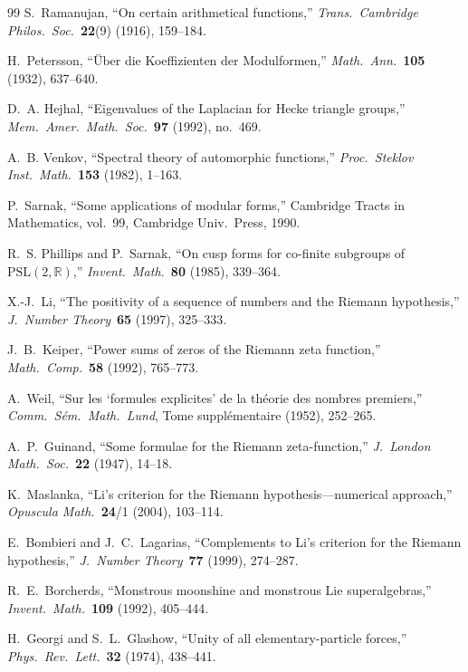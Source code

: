 \documentclass[11pt,a4paper]{article}
\theoremstyle{plain}
\theoremstyle{remark}
\newcommand{\R}{\mathbb{R}}
\begin{document}
\begin{thebibliography}{99}
S.~Ramanujan,
``On certain arithmetical functions,''
\emph{Trans.\ Cambridge Philos.\ Soc.}\ \textbf{22}(9) (1916), 159--184.

H.~Petersson,
``\"Uber die Koeffizienten der Modulformen,''
\emph{Math.\ Ann.}\ \textbf{105} (1932), 637--640.

D.~A. Hejhal,
``Eigenvalues of the Laplacian for Hecke triangle groups,''
\emph{Mem.\ Amer.\ Math.\ Soc.}\ \textbf{97} (1992), no.~469.

A.~B. Venkov,
``Spectral theory of automorphic functions,''
\emph{Proc.\ Steklov Inst.\ Math.}\ \textbf{153} (1982), 1--163.

P.~Sarnak,
``Some applications of modular forms,''
Cambridge Tracts in Mathematics, vol.~99, Cambridge Univ.\ Press, 1990.

R.~S. Phillips and P.~Sarnak,
``On cusp forms for co-finite subgroups of $\mathrm{PSL}(2,\R)$,''
\emph{Invent.\ Math.}\ \textbf{80} (1985), 339--364.

X.-J.~Li,
``The positivity of a sequence of numbers and the Riemann hypothesis,''
\emph{J.\ Number Theory}\ \textbf{65} (1997), 325--333.

J.~B.~Keiper,
``Power sums of zeros of the Riemann zeta function,''
\emph{Math.\ Comp.}\ \textbf{58} (1992), 765--773.

A.~Weil,
``Sur les `formules explicites' de la th\'eorie des nombres premiers,''
\emph{Comm.\ S\'em.\ Math.\ Lund}, Tome suppl\'ementaire (1952), 252--265.

A.~P.~Guinand,
``Some formulae for the Riemann zeta-function,''
\emph{J.\ London Math.\ Soc.}\ \textbf{22} (1947), 14--18.

K.~Maslanka,
``Li's criterion for the Riemann hypothesis---numerical approach,''
\emph{Opuscula Math.}\ \textbf{24}/1 (2004), 103--114.

E.~Bombieri and J.~C.~Lagarias,
``Complements to Li's criterion for the Riemann hypothesis,''
\emph{J.\ Number Theory}\ \textbf{77} (1999), 274--287.

R.~E.~Borcherds,
``Monstrous moonshine and monstrous Lie superalgebras,''
\emph{Invent.\ Math.}\ \textbf{109} (1992), 405--444.

H.~Georgi and S.~L.~Glashow,
``Unity of all elementary-particle forces,''
\emph{Phys.\ Rev.\ Lett.}\ \textbf{32} (1974), 438--441.


\end{thebibliography}
\end{document}
